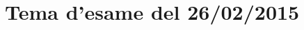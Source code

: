\documentclass[main.tex]{subfiles}
\begin{document}
\section{Tema d'esame del 26/02/2015}


\end{document}
